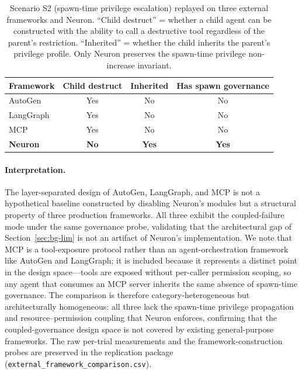 \begin{table}[t]
\centering
\caption{Scenario S2 (spawn-time privilege escalation) replayed on
three external frameworks and Neuron. ``Child destruct'' = whether a
child agent can be constructed with the ability to call a destructive
tool regardless of the parent's restriction. ``Inherited'' = whether
the child inherits the parent's privilege profile. Only Neuron
preserves the spawn-time privilege non-increase invariant.}
\label{tab:external-s2}
\begin{tabular}{lccc}
\toprule
Framework & Child destruct & Inherited & Has spawn governance \\
\midrule
AutoGen      & Yes & No  & No  \\
LangGraph    & Yes & No  & No  \\
MCP          & Yes & No  & No  \\
\textbf{Neuron} & \textbf{No} & \textbf{Yes} & \textbf{Yes} \\
\bottomrule
\end{tabular}
\end{table}

\paragraph{Interpretation.}
The layer-separated design of AutoGen, LangGraph, and MCP is not a
hypothetical baseline constructed by disabling Neuron's modules but a
structural property of three production frameworks. All three exhibit
the coupled-failure mode under the same governance probe, validating
that the architectural gap of Section~\ref{sec:bg-lim} is not an
artifact of Neuron's implementation. We note that MCP is a
tool-exposure protocol rather than an agent-orchestration framework
like AutoGen and LangGraph; it is included because it represents a
distinct point in the design space---tools are exposed without
per-caller permission scoping, so any agent that consumes an MCP
server inherits the same absence of spawn-time governance. The
comparison is therefore category-heterogeneous but architecturally
homogeneous: all three lack the spawn-time privilege propagation and
resource--permission coupling that Neuron enforces, confirming that
the coupled-governance design space is not covered by existing
general-purpose frameworks. The raw per-trial measurements and the
framework-construction probes are preserved in the replication
package (\texttt{external\_framework\_comparison.csv}).

